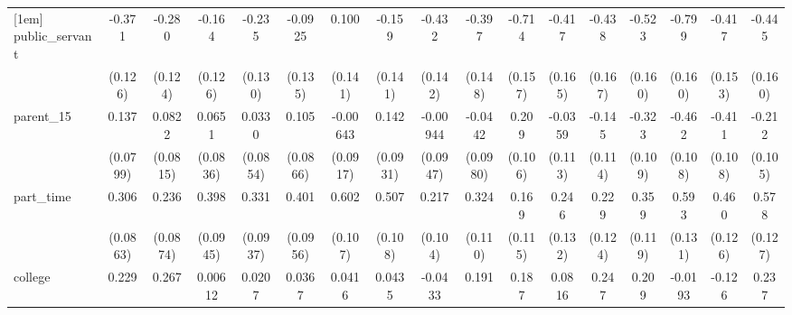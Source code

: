 {\begin{tabular}{l*{16}{c}}
[1em]
public\_servant      &      -0.371\sym{**} &      -0.280\sym{*}  &      -0.164         &      -0.235         &     -0.0925         &       0.100         &      -0.159         &      -0.432\sym{**} &      -0.397\sym{**} &      -0.714\sym{***}&      -0.417\sym{*}  &      -0.438\sym{**} &      -0.523\sym{**} &      -0.799\sym{***}&      -0.417\sym{**} &      -0.445\sym{**} \\
                    &     (0.126)         &     (0.124)         &     (0.126)         &     (0.130)         &     (0.135)         &     (0.141)         &     (0.141)         &     (0.142)         &     (0.148)         &     (0.157)         &     (0.165)         &     (0.167)         &     (0.160)         &     (0.160)         &     (0.153)         &     (0.160)         \\
[1em]
parent\_15           &       0.137         &      0.0822         &      0.0651         &      0.0330         &       0.105         &    -0.00643         &       0.142         &    -0.00944         &     -0.0442         &       0.209\sym{*}  &     -0.0359         &      -0.145         &      -0.323\sym{**} &      -0.462\sym{***}&      -0.411\sym{***}&      -0.212\sym{*}  \\
                    &    (0.0799)         &    (0.0815)         &    (0.0836)         &    (0.0854)         &    (0.0866)         &    (0.0917)         &    (0.0931)         &    (0.0947)         &    (0.0980)         &     (0.106)         &     (0.113)         &     (0.114)         &     (0.109)         &     (0.108)         &     (0.108)         &     (0.105)         \\
[1em]
part\_time           &       0.306\sym{***}&       0.236\sym{**} &       0.398\sym{***}&       0.331\sym{***}&       0.401\sym{***}&       0.602\sym{***}&       0.507\sym{***}&       0.217\sym{*}  &       0.324\sym{**} &       0.169         &       0.246         &       0.229         &       0.359\sym{**} &       0.593\sym{***}&       0.460\sym{***}&       0.578\sym{***}\\
                    &    (0.0863)         &    (0.0874)         &    (0.0945)         &    (0.0937)         &    (0.0956)         &     (0.107)         &     (0.108)         &     (0.104)         &     (0.110)         &     (0.115)         &     (0.132)         &     (0.124)         &     (0.119)         &     (0.131)         &     (0.126)         &     (0.127)         \\
[1em]
college             &       0.229\sym{*}  &       0.267\sym{**} &     0.00612         &      0.0207         &      0.0367         &      0.0416         &      0.0435         &     -0.0433         &       0.191         &       0.187         &      0.0816         &       0.247         &       0.209         &     -0.0193         &      -0.126         &       0.237         \\

\end{tabular}}
